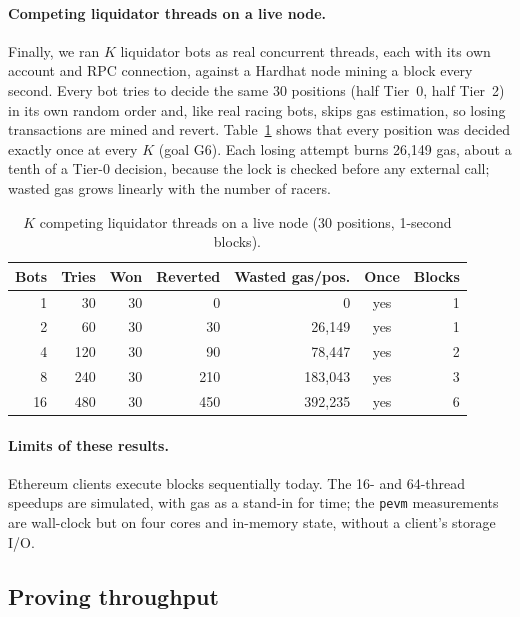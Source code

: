 \documentclass[sigconf,nonacm]{acmart}
\newcommand{\code}[1]{\texttt{\smaller #1}}
\begin{document}
\paragraph{Competing liquidator threads on a live node.}
\label{sec:eval-race}
Finally, we ran $K$ liquidator bots as real concurrent threads, each with its own account and RPC connection, against a Hardhat node mining a block every second. Every bot tries to decide the same 30 positions (half Tier~0, half Tier~2) in its own random order and, like real racing bots, skips gas estimation, so losing transactions are mined and revert. Table~\ref{tab:race} shows that every position was decided exactly once at every $K$ (goal G6). Each losing attempt burns 26,149 gas, about a tenth of a Tier-0 decision, because the lock is checked before any external call; wasted gas grows linearly with the number of racers.

\begin{table}[t]
  \caption{$K$ competing liquidator threads on a live node (30 positions, 1-second blocks).}
  \label{tab:race}
  \footnotesize
  \setlength{\tabcolsep}{3pt}
  \begin{tabular}{@{}rrrrrcr@{}}
    \toprule
    \textbf{Bots} & \textbf{Tries} & \textbf{Won} & \textbf{Reverted} & \textbf{Wasted gas/pos.} & \textbf{Once} & \textbf{Blocks} \\
    \midrule
    1 & 30 & 30 & 0 & 0 & yes & 1 \\
    2 & 60 & 30 & 30 & 26,149 & yes & 1 \\
    4 & 120 & 30 & 90 & 78,447 & yes & 2 \\
    8 & 240 & 30 & 210 & 183,043 & yes & 3 \\
    16 & 480 & 30 & 450 & 392,235 & yes & 6 \\
    \bottomrule
  \end{tabular}
\end{table}

\paragraph{Limits of these results.} Ethereum clients execute blocks sequentially today. The 16- and 64-thread speedups are simulated, with gas as a stand-in for time; the \code{pevm} measurements are wall-clock but on four cores and in-memory state, without a client's storage I/O.

\subsection{Proving throughput}
\label{sec:eval-proving}
\end{document}
